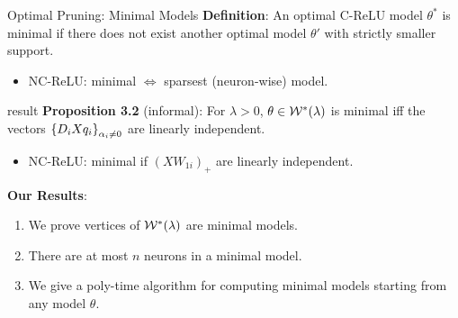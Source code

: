 \documentclass[usenames,dvipsnames,mathserif,notheorems]{beamer}
\newcommand{\bad}[1]{\textcolor{bad}{#1}}
\newcommand{\good}[1]{\textcolor{good}{#1}}
\begin{document}
\begin{frame}{Optimal Pruning: Minimal Models}
	\textbf{Definition}: An optimal C-ReLU model \( \theta^* \) is minimal if
	there does not exist another optimal model \( \theta' \) with \bad{strictly
		smaller support}.

	\pause
	\begin{itemize}
		\item \bad{NC-ReLU}: minimal \( \iff \) \good{sparsest} (neuron-wise) model.
	\end{itemize}


	\vspace{3ex}
	\pause

	\begin{beamercolorbox}[wd=\textwidth,sep=1em]{result}
		\textbf{Proposition 3.2} (informal):
		For \( \lambda > 0 \), \( \theta \in \mathcal{W}^*(\lambda) \) is \good{minimal}
		iff
		the vectors \( \left\{D_i X q_i\right\}_{\alpha_i \neq 0} \)
		are linearly independent.
	\end{beamercolorbox}

	\pause

	\begin{itemize}
		\item \bad{NC-ReLU}: minimal if \( (X W_{1i})_+ \) are linearly independent.
	\end{itemize}

	\vspace{1ex}
	\pause


	\textbf{Our Results}:
	\begin{enumerate}
		\item We prove vertices of \( \mathcal{W}^*(\lambda) \) are minimal models.
		      \pause
		\item There are at most \( n \) neurons in a minimal model.
		      \pause
		\item We give a poly-time algorithm for computing minimal models
		      starting from any model \( \theta \).
	\end{enumerate}

\end{frame}
\end{document}
